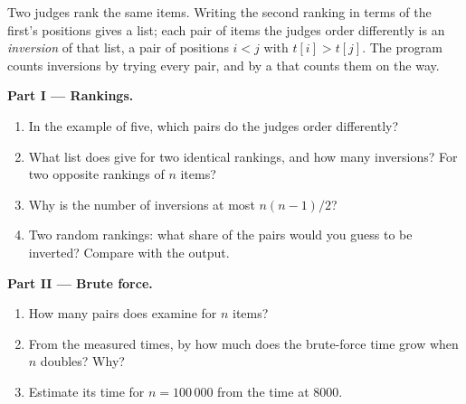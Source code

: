 \begin{problem}\label{pb:g12:divide-and-conquer:1}
Two judges rank the same items. Writing the second ranking in terms of the first's positions gives a list; each pair
of items the judges order differently is an \emph{inversion} of that list, a pair of positions $i < j$ with
$t[i] > t[j]$. The program counts inversions by trying every pair, and by a  that counts them on the way.

\label{lst:g12:divide-and-conquer:inversions}

\label{lst:g12:divide-and-conquer:inversions-run}

\label{out:g12:divide-and-conquer:inversions}

\label{lst:g12:divide-and-conquer:measure-inversions}

\label{out:g12:divide-and-conquer:measure-inversions}

\medskip\noindent\textbf{Part I --- Rankings.}
\begin{enumerate}
  \item In the example of five, which pairs do the judges order differently?
  \item What list does  give for two identical rankings, and how many inversions? For two opposite
    rankings of $n$ items?
  \item Why is the number of inversions at most $n(n - 1)/2$?
  \item Two random rankings: what share of the pairs would you guess to be inverted? Compare with the output.
\end{enumerate}

\medskip\noindent\textbf{Part II --- Brute force.}
\begin{enumerate}[resume]
  \item How many pairs does  examine for $n$ items?
  \item From the measured times, by how much does the brute-force time grow when $n$ doubles? Why?
  \item Estimate its time for $n = 100\,000$ from the time at $8000$.
\end{enumerate}


\end{problem}
